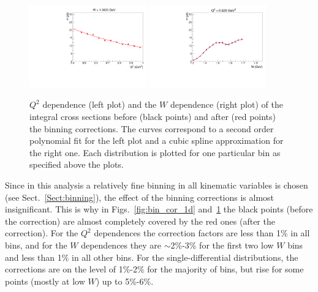 \begin{figure}[htp]
\begin{center}
\includegraphics[width=0.45\textwidth]{pictures/corrections/bin_cor_q2.pdf}
\includegraphics[width=0.45\textwidth]{pictures/corrections/bin_cor_w.pdf}
\caption{\small $Q^{2}$ dependence (left plot) and the $W$ dependence (right plot) of the integral cross sections before (black points) and after (red points) the binning corrections. The curves correspond to a second order polynomial fit for the left plot and a cubic spline approximation for the right one. Each distribution is plotted for one particular bin as specified above the plots.} \label{fig:bincor_w_q2}
\end{center}
\end{figure}
 
Since in this analysis a relatively fine binning in all kinematic variables is chosen (see Sect.~\ref{Sect:binning}), the effect of the binning corrections is almost insignificant. 
This is why in Figs.~\ref{fig:bin_cor_1d} and~\ref{fig:bincor_w_q2} the black points (before the correction) are almost completely covered by the red ones (after the correction). For the $Q^{2}$ dependences the correction factors are less than 1\% in all bins, and for the $W$ dependences they are $\sim$2\%-3\% for the first two low $W$ bins and less than 1\% in all other bins. For the single-differential distributions, the corrections are on the level of 1\%-2\% for the majority of bins, but rise for some points (mostly at low $W$) up to 5\%-6\%.



